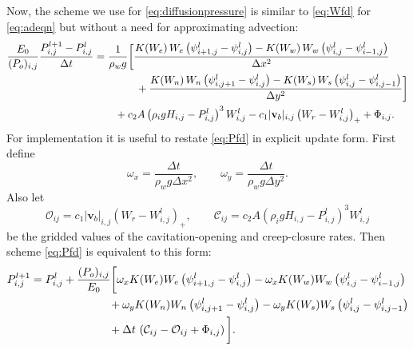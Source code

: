 \documentclass[11pt,final]{amsart}%
\newcommand\bv{\mathbf{v}}
\newcommand{\Wlij}{W^l_{i,j}}
\newcommand{\Plij}{P^l_{i,j}}
\begin{document}
Now, the scheme we use for \eqref{eq:diffusionpressure} is similar to \eqref{eq:Wfd} for \eqref{eq:adeqn} but without a need for approximating advection:
\begin{align}
\frac{E_0}{(P_o)_{i,j}} \frac{P_{i,j}^{l+1} - \Plij}{\Delta t} &= \frac{1}{\rho_w g} \bigg[\frac{K(W_e)\,W_e \left(\psi_{i+1,j}^l - \psi_{i,j}^l\right) - K(W_w)\,W_w \left(\psi_{i,j}^l - \psi_{i-1,j}^l\right)}{\Delta x^2}  \label{eq:Pfd} \\
      &\qquad\qquad + \frac{K(W_n)\,W_n \left(\psi_{i,j+1}^l - \psi_{i,j}^l\right) - K(W_s)\,W_s \left(\psi_{i,j}^l - \psi_{i,j-1}^l\right)}{\Delta y^2}\bigg] \notag \\
      &\qquad + c_2 A \left(\rho_i g H_{i,j}- \Plij\right)^3 \Wlij - c_1 |\bv_b|_{i,j} \left(W_r - \Wlij\right)_+ + \Phi_{i,j}. \notag
\end{align}
For implementation it is useful to restate \eqref{eq:Pfd} in explicit update form.  First define
	$$\omega_x = \frac{\Delta t}{\rho_w g \Delta x^2}, \qquad \omega_y = \frac{\Delta t}{\rho_w g \Delta y^2}.$$
Also let
	$$\mathcal{O}_{ij} = c_1 |\bv_b|_{i,j} \left(W_r - \Wlij\right)_+, \qquad \mathcal{C}_{ij} = c_2 A \left(\rho_i g H_{i,j} - \Plij\right)^3 \Wlij$$
be the gridded values of the cavitation-opening and creep-closure rates.  Then scheme \eqref{eq:Pfd} is equivalent to this form:
\begin{align}
P_{i,j}^{l+1} &= \Plij +  \frac{(P_o)_{i,j}}{E_0} \bigg[\omega_x K(W_e) W_e \left(\psi_{i+1,j}^l - \psi_{i,j}^l\right) - \omega_x K(W_w) W_w \left(\psi_{i,j}^l - \psi_{i-1,j}^l\right) \label{eq:Pfdupdate} \\
      &\qquad\qquad\qquad\quad + \omega_y K(W_n) W_n \left(\psi_{i,j+1}^l - \psi_{i,j}^l\right) - \omega_y K(W_s) W_s \left(\psi_{i,j}^l - \psi_{i,j-1}^l\right) \notag \\
      &\qquad\qquad\qquad\quad + \Delta t\, \left(\mathcal{C}_{ij} - \mathcal{O}_{ij} + \Phi_{i,j}\right)\bigg]. \notag
\end{align}
\end{document}
